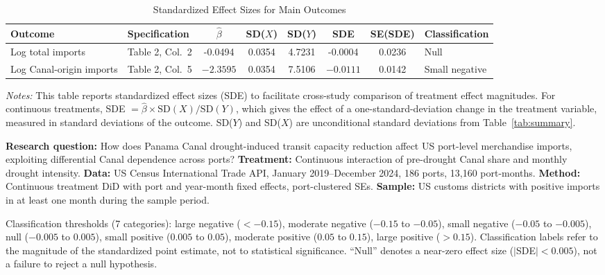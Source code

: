 \begin{table}[H]
\centering
\caption{Standardized Effect Sizes for Main Outcomes}
\label{tab:sde}
\begin{adjustbox}{max width=\textwidth}
\begin{tabular}{llcccccl}
\toprule
Outcome & Specification & $\hat{\beta}$ & SD($X$) & SD($Y$) & SDE & SE(SDE) & Classification \\
\midrule
Log total imports & Table 2, Col.~2 & -0.0494 & 0.0354 & 4.7231 & -0.0004 & 0.0236 & Null \\
Log Canal-origin imports & Table 2, Col.~5 & $-2.3595$ & 0.0354 & 7.5106 & $-0.0111$ & 0.0142 & Small negative \\
\bottomrule
\end{tabular}
\end{adjustbox}
\par\vspace{0.3em}
{\footnotesize \emph{Notes:} This table reports standardized effect sizes (SDE)
to facilitate cross-study comparison of treatment effect magnitudes.
For continuous treatments, SDE $= \hat{\beta} \times \text{SD}(X) / \text{SD}(Y)$,
which gives the effect of a one-standard-deviation change in the treatment variable,
measured in standard deviations of the outcome.
SD($Y$) and SD($X$) are unconditional standard deviations from Table~\ref{tab:summary}.

\textbf{Research question:} How does Panama Canal drought-induced transit capacity reduction
affect US port-level merchandise imports, exploiting differential Canal dependence across ports?
\textbf{Treatment:} Continuous interaction of pre-drought Canal share and monthly drought intensity.
\textbf{Data:} US Census International Trade API, January 2019--December 2024, 186 ports, 13,160 port-months.
\textbf{Method:} Continuous treatment DiD with port and year-month fixed effects, port-clustered SEs.
\textbf{Sample:} US customs districts with positive imports in at least one month during the sample period.

Classification thresholds (7 categories): large negative ($< -0.15$), moderate negative
($-0.15$ to $-0.05$), small negative ($-0.05$ to $-0.005$), null ($-0.005$ to $0.005$),
small positive ($0.005$ to $0.05$), moderate positive ($0.05$ to $0.15$),
large positive ($> 0.15$).
Classification labels refer to the magnitude of the standardized point estimate,
not to statistical significance. ``Null'' denotes a near-zero effect size ($|$SDE$| < 0.005$),
not a failure to reject a null hypothesis.}
\end{table}
